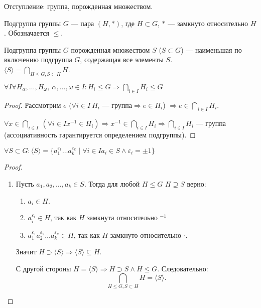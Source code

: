  Отступление: группа, порожденная множеством.
 \begin{definition}
     Подгруппа группы $G$ --- пара  $(H, \ast)$, где  $H \subset G$,  $\ast$ --- замкнуто относительно $H$. Обозначается $\le$.
 \end{definition}
 \begin{definition}
     Подгруппа группы $G$ порожденная множеством  $S$  ($S \subset G$) --- наименьшая по включению подгруппа $G$, содержащая все элементы  $S$.\\
     $\langle S \rangle = \displaystyle \bigcap_{H \le G, S \subset H} H$.\\
 \end{definition}
 \begin{remark}
     $\forall I \forall H_\alpha, \ldots, H_\omega,\ \alpha, \ldots, \omega \in I\!: H_i \le G \Rightarrow \displaystyle \bigcap_{i \in I} H_i \le G$
 \end{remark}
 \begin{proof}
    Рассмотрим $e$ ($\forall i \in I\ H_i\text{ --- группа} \Rightarrow e \in H_i$) $\Rightarrow e \in \bigcap_{i \in I} H_i$.
    
    $\forall x \in \bigcap_{i \in I}\ (\forall i \in I x^{-1} \in H_i) \Rightarrow x^{-1} \in \bigcap_{i \in I} H_i \Rightarrow \bigcap_{i \in I} H_i$ --- группа (ассоциативность гарантируется определением подгруппы).
 \end{proof}
 \begin{theorem}
     $\forall S \subset G\!: \langle S \rangle= \{a_1^{\varepsilon_1} \ldots a_k^{\varepsilon_k} \mid \forall i \in I a_i \in S \land \varepsilon_i = \pm 1\}$
 \end{theorem}
 \begin{proof}
     \slashn
     \begin{enumerate}
         \item Пусть $a_1, a_2, \ldots, a_k \in S$. Тогда для любой $H \le G$ $H \supseteq S$ верно:
              \begin{enumerate}
                  \item $a_i \in H$.
                  \item  $a_i^{\varepsilon_i} \in H$, так как  $H$ замкнута относительно $^{-1}$
                  \item  $a_1^{\varepsilon_1} a_2^{\varepsilon_2} \ldots a_k^{\varepsilon_k} \in H$, так как $H$ замкнуто относительно  $\cdot$.
             \end{enumerate}

             Значит $H \supset \langle S \rangle \Rightarrow \langle S \rangle \subseteq H$.
        
             С другой стороны $H = \langle S \rangle \Rightarrow H \supset S \land H \le G$. Следовательно:  \[
                 \bigcap_{H \le G, S \subset H} H = \langle S \rangle
             .\] 
     \end{enumerate}

 \end{proof}


